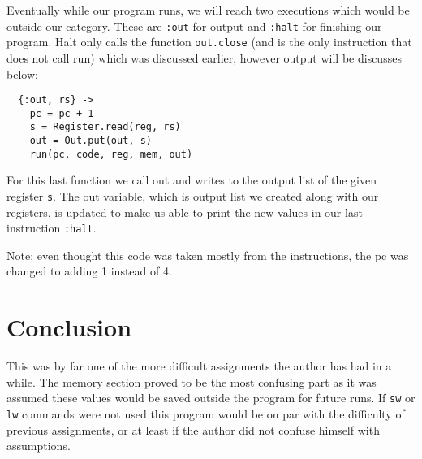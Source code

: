 \documentclass[a4paper,11pt]{article}
\begin{document}
Eventually while our program runs, we will reach two executions which would be outside our category. These are {\tt :out} for output and {\tt :halt} for finishing our program. Halt only calls the function {\tt out.close} (and is the only instruction that does not call run) which was discussed earlier, however output will be discusses below:

\begin{verbatim}
  {:out, rs} ->
    pc = pc + 1
    s = Register.read(reg, rs)
    out = Out.put(out, s)
    run(pc, code, reg, mem, out)
\end{verbatim}

For this last function we call out and writes to the output list of the given register {\tt s}. The out variable, which is output list we created along with our registers, is updated to make us able to print the new values in our last instruction {\tt :halt}.

Note: even thought this code was taken mostly from the instructions, the pc was changed to adding 1 instead of 4.

\section*{Conclusion}

This was by far one of the more difficult assignments the author has had in a while. The memory section proved to be the most confusing part as it was assumed these values would be saved outside the program for future runs. If {\tt sw} or {\tt lw} commands were not used this program would be on par with the difficulty of previous assignments, or at least if the author did not confuse himself with assumptions.
\end{document}
